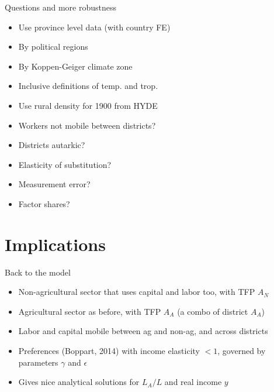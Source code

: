 \documentclass[10pt, xcolor=dvipsnames]{beamer}
\begin{document}
\begin{frame}{Questions and more robustness}\label{robustness}
\begin{itemize}
  \item Use province level data (with country FE) \hyperlink{regprov}{}
  \item By political regions \hyperlink{subregiontab}{}
  \item By Koppen-Geiger climate zone \hyperlink{climatereg}{}
  \item Inclusive definitions of temp. and trop. \hyperlink{definition}{}
  \item Use rural density for 1900 from HYDE \hyperlink{reg1900}{}
  \item Workers not mobile between districts? \hyperlink{nonmobile}{}
  \item Districts autarkic? \hyperlink{autarky}{}  
  \item Elasticity of substitution? \hyperlink{eos}{}
  \item Measurement error? \hyperlink{measure}{}
  \item Factor shares? \hyperlink{shares}{}
\end{itemize}
\end{frame}

\section{Implications}

\begin{frame}{Back to the model}\label{extend}
\begin{itemize}
  \item Non-agricultural sector that uses capital and labor too, with TFP $A_N$
  \item Agricultural sector as before, with TFP $A_A$ (a combo of district $A_A$)
  \item Labor and capital mobile between ag and non-ag, and across districts
  \item Preferences (Boppart, 2014) with income elasticity $<1$, governed by parameters $\gamma$ and $\epsilon$
  \item Gives nice analytical solutions for $L_A/L$ and real income $y$
\end{itemize}

\end{frame}
\end{document}
